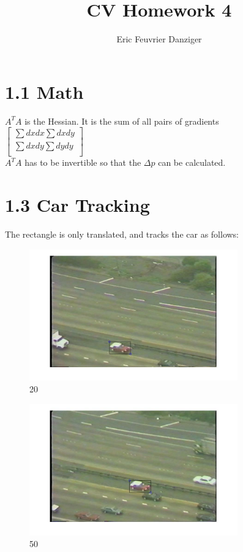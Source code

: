 \documentclass[11pt]{article}
\title{\textbf{CV Homework 4}}
\author{Eric Feuvrier Danziger\\
		}
\date{}
\begin{document}
\maketitle

\section*{1.1 Math}
$A^TA$ is the Hessian. It is the sum of all pairs of gradients\\
$\begin{bmatrix}
\sum{dxdx} \sum{dxdy}\\
\sum{dxdy} \sum{dydy}\\
\end{bmatrix}$\\
$A^TA$ has to be invertible so that the $\Delta{p}$ can be calculated.\\

\section*{1.3 Car Tracking}
The rectangle is only translated, and tracks the car as follows:
\begin{figure}[H]
\centering
\includegraphics[width=90mm]{carFrame20.jpg}
\caption{ 20 }
\end{figure}

\begin{figure}[H]
\centering
\includegraphics[width=90mm]{carFrame50.jpg}
\caption{ 50 }
\end{figure}
\end{document}
